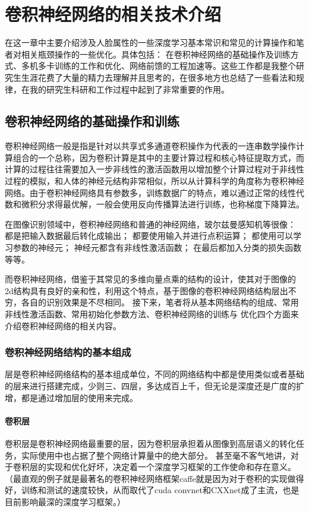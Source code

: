 \chapter {卷积神经网络的相关技术介绍}
在这一章中主要介绍涉及人脸属性的一些深度学习基本常识和常见的计算操作和笔者对相关瓶颈操作的一些优化。具体包括：
在卷积神经网络的基础操作及训练方式、多机多卡训练的工作和优化、网络前馈的工程加速等。这些工作都是我整个研究生生涯花费了大量的精力去理解并且思考的，在很多地方也总结了一些看法和规律，在我的研究生科研和工作过程中起到了非常重要的作用。
\section{卷积神经网络的基础操作和训练}
卷积神经网络一般是指是针对以共享式多通道卷积操作为代表的一连串数学操作计算组合的一个总称，因为卷积计算是其中的主要计算过程和核心特征提取方式，而计算的过程往往需要加入一步非线性的激活函数用以增加整个计算过程对于非线性过程的模拟，和人体的神经元结构非常相似，所以从计算科学的角度称为卷积神经网络。由于卷积神经网络具有参数多，训练数据广的特点，难以通过正常的线性代数和微积分求得最优解，一般会使用反向传播算法进行训练，也称梯度下降算法。

在图像识别领域中，卷积神经网络和普通的神经网络，玻尔兹曼感知机等很像：
都是把输入数据最后转化成输出；
都要使用输入并进行点积运算；
都使用可以学习参数的神经元；
神经元都含有非线性激活函数；
在最后都加入分类的损失函数等等。

而卷积神经网络，借鉴于其常见的多维向量点乘的结构的设计，使其对于图像的2d结构具有良好的亲和性，利用这个特点，基于图像的卷积神经网络结构层出不穷，各自的识别效果是不尽相同。 
接下来，笔者将从基本网络结构的组成、常用非线性激活函数、常用初始化参数方法、卷积神经网络的训练与 优化四个方面来介绍卷积神经网络的相关内容。
\subsection{卷积神经网络结构的基本组成}
层是卷积神经网络结构的基本组成单位，不同的网络结构中都是使用类似或者基础的层来进行搭建完成，少则三、四层，多达成百上千，但无论是深度还是广度的扩增，都是通过增加层的使用来完成。
\subsubsection{卷积层}
卷积层是卷积神经网络最重要的层，因为卷积层承担着从图像到高层语义的转化任务，实际使用中也占据了整个网络计算量中的绝大部分。
甚至毫不客气地讲，对于卷积层的实现和优化好坏，决定着一个深度学习框架的工作使命和存在意义。（最直观的例子就是最著名的卷积神经网络框架caffe就是因为对于卷积的实现做得好，训练和测试的速度较快，从而取代了cuda convnet和CXXnet成了主流，也是目前影响最深的深度学习框架。）

